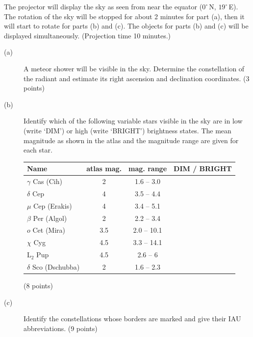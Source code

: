 The projector will display the sky as seen from near the equator
($0^\circ$\,N, $19^\circ$\,E). The rotation of the sky will be stopped for
about 2 minutes for part (a), then it will start to rotate for parts (b) and
(c). The objects for parts (b) and (c) will be displayed simultaneously.
(Projection time 10 minutes.)

\begin{description}
\item[(a)] A meteor shower will be visible in the sky. Determine the
  constellation of the radiant and estimate its right ascension and
  declination coordinates. \hfill(3 points)
\item[(b)] Identify which of the following variable stars visible in the sky
  are in low (write `DIM') or high (write `BRIGHT') brightness states. The
  mean magnitude as shown in the atlas and the magnitude range are given for
  each star.

  \begin{center}
  \begin{tabular}{lccc}
  Name & atlas mag. & mag. range & DIM / BRIGHT \\
  \hline
  $\gamma$ Cas (Cih) & 2 & 1.6 -- 3.0 & \\
  $\delta$ Cep & 4 & 3.5 -- 4.4 & \\
  $\mu$ Cep (Erakis) & 4 & 3.4 -- 5.1 & \\
  $\beta$ Per (Algol) & 2 & 2.2 -- 3.4 & \\
  $o$ Cet (Mira) & 3.5 & 2.0 -- 10.1 & \\
  $\chi$ Cyg & 4.5 & 3.3 -- 14.1 & \\
  L$_2$ Pup & 4.5 & 2.6 -- 6 & \\
  $\delta$ Sco (Dschubba) & 2 & 1.6 -- 2.3 & \\
  \end{tabular}
  \end{center}
  \hfill(8 points)
\item[(c)] Identify the constellations whose borders are marked and give
  their IAU abbreviations. \hfill(9 points)
\end{description}
